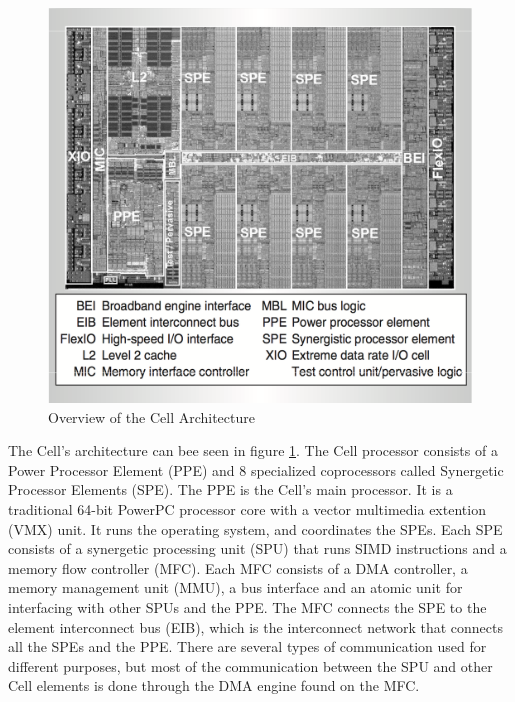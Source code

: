 \begin{figure}[htb]
    \centering
    \includegraphics[width=1\textwidth]{Figures/DMA/CellTop}
    \caption{Overview of the Cell Architecture \cite{cell}}
    \label{fig:CellTop}
\end{figure}

The Cell's architecture can bee seen in figure \ref{fig:CellTop}.
The Cell processor consists of a Power Processor Element (PPE) and 8 specialized coprocessors called Synergetic Processor Elements (SPE).
The PPE is the Cell's main processor.
It is a traditional 64-bit PowerPC processor core with a vector multimedia extention (VMX) unit.
It runs the operating system, and coordinates the SPEs.
Each SPE consists of a synergetic processing unit (SPU) that runs SIMD instructions and a memory flow controller (MFC).
Each MFC consists of a DMA controller, a memory management unit (MMU), a bus interface and an atomic unit for interfacing with other SPUs and the PPE.
The MFC connects the SPE to the element interconnect bus (EIB), which is the interconnect network that connects all the SPEs and the PPE.
There are several types of communication used for different purposes, but most of the communication between the SPU and other Cell elements is done through the DMA engine found on the MFC.

